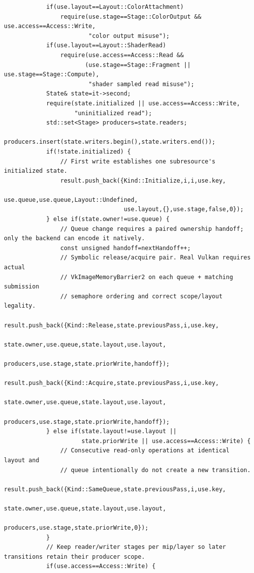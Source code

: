 \begin{verbatim}
            if(use.layout==Layout::ColorAttachment)
                require(use.stage==Stage::ColorOutput && use.access==Access::Write,
                        "color output misuse");
            if(use.layout==Layout::ShaderRead)
                require(use.access==Access::Read &&
                       (use.stage==Stage::Fragment || use.stage==Stage::Compute),
                        "shader sampled read misuse");
            State& state=it->second;
            require(state.initialized || use.access==Access::Write,
                    "uninitialized read");
            std::set<Stage> producers=state.readers;
            producers.insert(state.writers.begin(),state.writers.end());
            if(!state.initialized) {
                // First write establishes one subresource's initialized state.
                result.push_back({Kind::Initialize,i,i,use.key,
                                  use.queue,use.queue,Layout::Undefined,
                                  use.layout,{},use.stage,false,0});
            } else if(state.owner!=use.queue) {
                // Queue change requires a paired ownership handoff; only the backend can encode it natively.
                const unsigned handoff=nextHandoff++;
                // Symbolic release/acquire pair. Real Vulkan requires actual
                // VkImageMemoryBarrier2 on each queue + matching submission
                // semaphore ordering and correct scope/layout legality.
                result.push_back({Kind::Release,state.previousPass,i,use.key,
                                  state.owner,use.queue,state.layout,use.layout,
                                  producers,use.stage,state.priorWrite,handoff});
                result.push_back({Kind::Acquire,state.previousPass,i,use.key,
                                  state.owner,use.queue,state.layout,use.layout,
                                  producers,use.stage,state.priorWrite,handoff});
            } else if(state.layout!=use.layout ||
                      state.priorWrite || use.access==Access::Write) {
                // Consecutive read-only operations at identical layout and
                // queue intentionally do not create a new transition.
                result.push_back({Kind::SameQueue,state.previousPass,i,use.key,
                                  state.owner,use.queue,state.layout,use.layout,
                                  producers,use.stage,state.priorWrite,0});
            }
            // Keep reader/writer stages per mip/layer so later transitions retain their producer scope.
            if(use.access==Access::Write) {

\end{verbatim}
